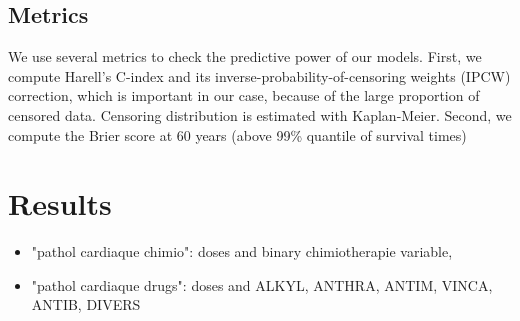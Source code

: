 \documentclass{article}
\begin{document}
\subsection{Metrics}

We use several metrics to check the predictive power of our models. First, we compute Harell's C-index and its inverse-probability-of-censoring weights (IPCW) correction, which is important in our case, because of the large proportion of censored data. Censoring distribution is estimated with Kaplan-Meier. 
Second, we compute the Brier score at 60 years (above 99\% quantile of survival times)

\section{Results}


\begin{itemize}
    \item "pathol cardiaque chimio": doses and binary chimiotherapie variable,
    \item "pathol cardiaque drugs": doses and ALKYL, ANTHRA, ANTIM, VINCA, ANTIB, DIVERS 
\end{itemize}

\newcommand{\nbestim}{10}
\newcommand{\analyzesdir}{/media/moud/LaCie/local_results/analyzes}
\end{document}
